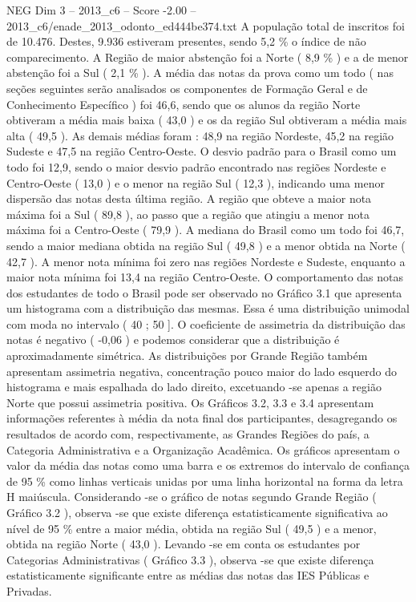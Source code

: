 \begin{textsample}{NEG Dim 3 – 2013\_c6 – Score -2.00 – 2013\_c6/enade\_2013\_odonto\_ed444be374.txt}
A população total de inscritos foi de 10.476.
Destes, 9.936 estiveram presentes, sendo 5,2 \% o índice de não comparecimento.
A Região de maior abstenção foi a Norte ( 8,9 \% ) e a de menor abstenção foi a Sul ( 2,1 \% ).
A média das notas da prova como um todo ( nas seções seguintes serão analisados os componentes de Formação Geral e de Conhecimento Específico ) foi 46,6, sendo que os alunos da região Norte obtiveram a média mais baixa ( 43,0 ) e os da região Sul obtiveram a média mais alta ( 49,5 ).
As demais médias foram : 48,9 na região Nordeste, 45,2 na região Sudeste e 47,5 na região Centro-Oeste.
O desvio padrão para o Brasil como um todo foi 12,9, sendo o maior desvio padrão encontrado nas regiões Nordeste e Centro-Oeste ( 13,0 ) e o menor na região Sul ( 12,3 ), indicando uma menor dispersão das notas desta última região.
A região que obteve a maior nota máxima foi a Sul ( 89,8 ), ao passo que a região que atingiu a menor nota máxima foi a Centro-Oeste ( 79,9 ).
A mediana do Brasil como um todo foi 46,7, sendo a maior mediana obtida na região Sul ( 49,8 ) e a menor obtida na Norte ( 42,7 ).
A menor nota mínima foi zero nas regiões Nordeste e Sudeste, enquanto a maior nota mínima foi 13,4 na região Centro-Oeste.
O comportamento das notas dos estudantes de todo o Brasil pode ser observado no Gráfico 3.1 que apresenta um histograma com a distribuição das mesmas.
Essa é uma distribuição unimodal com moda no intervalo ( 40 ; 50 ].
O coeficiente de assimetria da distribuição das notas é negativo ( -0,06 ) e podemos considerar que a distribuição é aproximadamente simétrica.
As distribuições por Grande Região também apresentam assimetria negativa, concentração pouco maior do lado esquerdo do histograma e mais espalhada do lado direito, excetuando -se apenas a região Norte que possui assimetria positiva.
Os Gráficos 3.2, 3.3 e 3.4 apresentam informações referentes à média da nota final dos participantes, desagregando os resultados de acordo com, respectivamente, as Grandes Regiões do país, a Categoria Administrativa e a Organização Acadêmica.
Os gráficos apresentam o valor da média das notas como uma barra e os extremos do intervalo de confiança de 95 \% como linhas verticais unidas por uma linha horizontal na forma da letra H maiúscula.
Considerando -se o gráfico de notas segundo Grande Região ( Gráfico 3.2 ), observa -se que existe diferença estatisticamente significativa ao nível de 95 \% entre a maior média, obtida na região Sul ( 49,5 ) e a menor, obtida na região Norte ( 43,0 ).
Levando -se em conta os estudantes por Categorias Administrativas ( Gráfico 3.3 ), observa -se que existe diferença estatisticamente significante entre as médias das notas das IES Públicas e Privadas.

\end{textsample}

